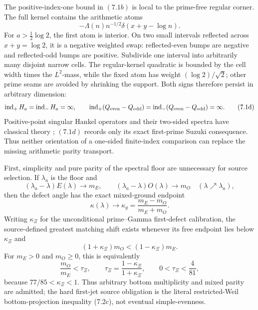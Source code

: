 \documentclass[11pt]{article}
\theoremstyle{definition}
\theoremstyle{remark}
\begin{document}
The positive-index-one bound in \((7.1b)\) is local to the prime-free regular corner.  The full
kernel contains the arithmetic atoms
\[
 -\Lambda(n)n^{-1/2}\delta(x+y-\log n).                  \tag{7.1c}
\]
For \(a>\frac12\log2\), the first atom is interior.  On two small intervals reflected across
\(x+y=\log2\), it is a negative weighted swap: reflected-even bumps are negative and
reflected-odd bumps are positive.  Subdivide one interval into arbitrarily many disjoint narrow
cells.  The regular-kernel quadratic is bounded by the cell width times the \(L^2\)-mass, while
the fixed atom has weight \((\log2)/\sqrt2\); other prime seams are avoided by shrinking the
support.  Both signs therefore persist in arbitrary dimension:
\[
 \operatorname{ind}_{+}H_a=\operatorname{ind}_{-}H_a=\infty,\qquad
 \operatorname{ind}_{+}(Q_{\rm even}-Q_{\rm odd})
 =\operatorname{ind}_{-}(Q_{\rm even}-Q_{\rm odd})=\infty. \tag{7.1d}
\]
Positive-point singular Hankel operators and their two-sided spectra have classical theory
\cite{Yafaev2013b}; \((7.1d)\) records only its exact first-prime Suzuki consequence.  Thus neither
orientation of a one-sided finite-index comparison can replace the missing arithmetic parity
transport.

First, simplicity and pure parity of the spectral
floor are unnecessary for source selection.  If $\lambda_a$ is the floor and
\[
 (\lambda_a-\lambda)E(\lambda)\longrightarrow m_E,\qquad
 (\lambda_a-\lambda)O(\lambda)\longrightarrow m_O
 \quad(\lambda\nearrow\lambda_a),
 \tag{7.2a}
\]
then the defect angle has the exact mixed-ground endpoint
\[
 \kappa(\lambda)\longrightarrow
 \kappa_g=\frac{m_E-m_O}{m_E+m_O}.
 \tag{7.2b}
\]
Writing $\kappa_\Xi$ for the unconditional prime--Gamma first-defect calibration, the
source-defined greatest matching shift exists whenever its free endpoint lies below
$\kappa_\Xi$ and
\[
 (1+\kappa_\Xi)m_O<(1-\kappa_\Xi)m_E.
 \tag{7.2c}
\]
For $m_E>0$ and $m_O\geq0$, this is equivalently
\[
 \frac{m_O}{m_E}<\tau_\Xi,\qquad
 \tau_\Xi=\frac{1-\kappa_\Xi}{1+\kappa_\Xi},\qquad
 0<\tau_\Xi<\frac4{81},
 \tag{7.2d}
\]
because $77/85<\kappa_\Xi<1$.  Thus arbitrary bottom multiplicity and mixed parity are admitted;
the hard first-jet source obligation is the literal restricted-Weil bottom-projection inequality
(7.2c), not eventual simple-evenness.
\end{document}
